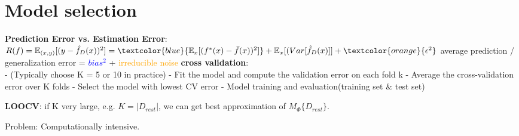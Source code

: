 
\section{Model selection}
\textbf{Prediction Error vs. Estimation Error}:
$R(f) = \mathbb{E}_{(x,y)}[(y - \hat{f}_D(x))^2] = \textcolor{blue}{\mathbb{E}_{x}[(f^{*}(x)-\bar{f}(x))^2]} + \mathbb{E}_{x}[(Var[\hat{f}_D(x)]] + \textcolor{orange}{\epsilon^2}$ average prediction / generalization error = \textcolor{blue}{$bias^2$} + \textcolor{orange}{irreducible noise} 
\textbf{cross validation}: \\
- (Typically choose K = 5 or 10 in practice)
- Fit the model and compute the validation error on each fold k  
- Average the cross-validation error over K folds  
- Select the model with lowest CV error 
- Model training and evaluation(training set $\&$ test set)

\textbf{LOOCV}:
if K very large, e.g. $K=|D_{rest}|$, we can get best approximation of
$M_\varPhi\{D_{rest}\}$. 

Problem: Computationally intensive. 
